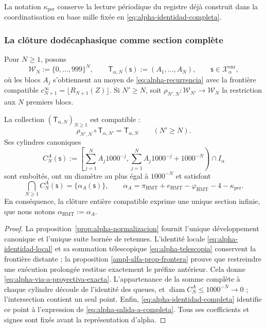 La notation \(\kappa_{\mathrm{per}}\) conserve la lecture périodique du registre déjà construit dans la coordinatisation en base mille fixée en \eqref{eq:alpha-identidad-completa}.

\subsubsection{La clôture dodécaphasique comme section complète}

Pour \(N\geq1\), posons
\[
 \mathcal W_N:=\{0,\ldots,999\}^{N},
 \qquad
 \mathsf T_{\alpha,N}(\mathsf s):=(A_1,\ldots,A_N),
 \qquad \mathsf s\in\mathcal X_{\alpha}^{\mathrm{enr}},
\]
où les blocs \(A_j\) s'obtiennent au moyen de
\eqref{eq:alpha-recurrencia} avec la frontière compatible
\(c_{N+1}^{\infty}=\lfloor R_{N+1}(Z)\rfloor\). Si \(N'\geq N\), soit
\(\rho_{N',N}:\mathcal W_{N'}\to\mathcal W_N\) la restriction aux
\(N\) premiers blocs.

\begin{theorem}
\label{thm:alpha-salida-dodecafasica-completa}
La collection \((\mathsf T_{\alpha,N})_{N\geq1}\) est compatible :
\begin{equation}
 \rho_{N',N}\circ\mathsf T_{\alpha,N'}
 =\mathsf T_{\alpha,N}
 \qquad(N'\geq N).
 \label{eq:alpha-via-a-proyectiva-exacta}
\end{equation}
Ses cylindres canoniques
\begin{equation}
 C_N^A(\mathsf s):=
 \left[
  \sum_{j=1}^{N}A_j1000^{-j},
  \sum_{j=1}^{N}A_j1000^{-j}+1000^{-N}
 \right)\cap I_\alpha
 \label{eq:alpha-cilindros-via-a-exactos}
\end{equation}
sont emboîtés, ont un diamètre au plus égal à \(1000^{-N}\) et satisfont
\begin{equation}
 \bigcap_{N\geq1}C_N^A(\mathsf s)
 =\{\alpha_A(\mathsf s)\},
 \qquad
 \alpha_A
 =\pi_{\mathrm{HMT}}+e_{\mathrm{HMT}}-\varphi_{\mathrm{HMT}}
  -4-\kappa_{\mathrm{per}}.
 \label{eq:alpha-salida-a-completa}
\end{equation}
En conséquence, la clôture entière compatible exprime une unique section infinie, que
nous notons \(\alpha_{\mathrm{HMT}}:=\alpha_A\).
\end{theorem}

\begin{proof}
La proposition~\ref{prop:alpha-normalizacion} fournit l'unique développement
canonique et l'unique suite bornée de retenues. L'identité locale
\eqref{eq:alpha-identidad-local} et sa sommation télescopique
\eqref{eq:alpha-telescopia} conservent la frontière distante ; la proposition
\ref{ampl-alfa-prop-frontera} prouve que restreindre une exécution prolongée
restitue exactement le préfixe antérieur. Cela donne
\eqref{eq:alpha-via-a-proyectiva-exacta}. L'appartenance de la somme complète
à chaque cylindre découle de l'identité des queues, et
\(\operatorname{diam}C_N^A\leq1000^{-N}\to0\) ; l'intersection contient un
seul point. Enfin, \eqref{eq:alpha-identidad-completa} identifie ce
point à l'expression de \eqref{eq:alpha-salida-a-completa}. Tous ses
coefficients et signes sont fixés avant la représentation d'alpha.
\end{proof}


